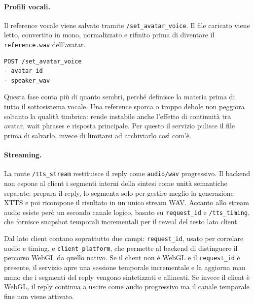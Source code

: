 \paragraph{Profili vocali.}
Il reference vocale viene salvato tramite \texttt{/set\_avatar\_voice}. Il file caricato viene letto, convertito in mono, normalizzato e rifinito prima di diventare il \texttt{reference.wav} dell'avatar.

\begin{lstlisting}[basicstyle=\ttfamily\small,breaklines=true,caption={Campi essenziali usati dal client nel setup voce.}]
POST /set_avatar_voice
- avatar_id
- speaker_wav
\end{lstlisting}

Questa fase conta più di quanto sembri, perché definisce la materia prima di tutto il sottosistema vocale. Una reference sporca o troppo debole non peggiora soltanto la qualità timbrica: rende instabile anche l'effetto di continuità tra avatar, wait phrases e risposta principale. Per questo il servizio pulisce il file prima di salvarlo, invece di limitarsi ad archiviarlo così com'è.

\paragraph{Streaming.}
La route \texttt{/tts\_stream} restituisce il reply come \texttt{audio/wav} progressivo. Il backend non espone al client i segmenti interni della sintesi come unità semantiche separate: prepara il reply, lo segmenta solo per gestire meglio la generazione XTTS e poi ricompone il risultato in un unico stream WAV. Accanto allo stream audio esiste però un secondo canale logico, basato su \texttt{request\_id} e \texttt{/tts\_timing}, che fornisce snapshot temporali incrementali per il reveal del testo lato client.

Dal lato client contano soprattutto due campi: \texttt{request\_id}, usato per correlare audio e timing, e \texttt{client\_platform}, che permette al backend di distinguere il percorso WebGL da quello nativo. Se il client non è WebGL e il \texttt{request\_id} è presente, il servizio apre una sessione temporale incrementale e la aggiorna man mano che i segmenti del reply vengono sintetizzati e allineati. Se invece il client è WebGL, il reply continua a uscire come audio progressivo ma il canale temporale fine non viene attivato.

